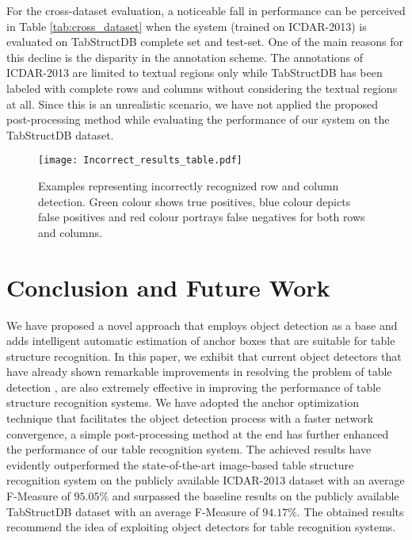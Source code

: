 \documentclass{ieeeaccess}
\begin{document}
For the cross-dataset evaluation, a noticeable fall in performance can be perceived in Table \ref{tab:cross_dataset} when the system (trained on ICDAR-2013) is evaluated on TabStructDB complete set and test-set. One of the main reasons for this decline is the disparity in the annotation scheme. The annotations of ICDAR-2013 are limited to textual regions only while TabStructDB has been labeled with complete rows and columns without considering the textual regions at all. Since this is an unrealistic scenario, we have not applied the proposed post-processing method while evaluating the performance of our system on the TabStructDB dataset.






\begin{figure*}[ht]
    \texttt{[image: Incorrect\_results\_table.pdf]}
    \caption{Examples representing incorrectly recognized row and column detection. Green colour shows true positives, blue colour depicts false positives and red colour portrays false negatives for both rows and columns.}
    \label{fig:incorrect_result_rows}
\end{figure*}


\section{Conclusion and Future Work}
\label{sec:conclusion}
We have proposed a novel approach that employs object detection as a base and adds intelligent automatic estimation of anchor boxes that are suitable for table structure recognition. In this paper, we exhibit that current object detectors that have already shown remarkable improvements in resolving the problem of table detection \cite{b27,b41}, are also extremely effective in improving the performance of table structure recognition systems. We have adopted the anchor optimization technique that facilitates the object detection process with a faster network convergence, a simple post-processing method at the end has further enhanced the performance of our table recognition system. The achieved results have evidently outperformed the state-of-the-art image-based table structure recognition system on the publicly available ICDAR-2013 dataset with an average F-Measure of $95.05\%$ and surpassed the baseline results on the publicly available TabStructDB dataset with an average F-Measure of $94.17\%$. The obtained results recommend the idea of exploiting object detectors for table recognition systems.
\end{document}
